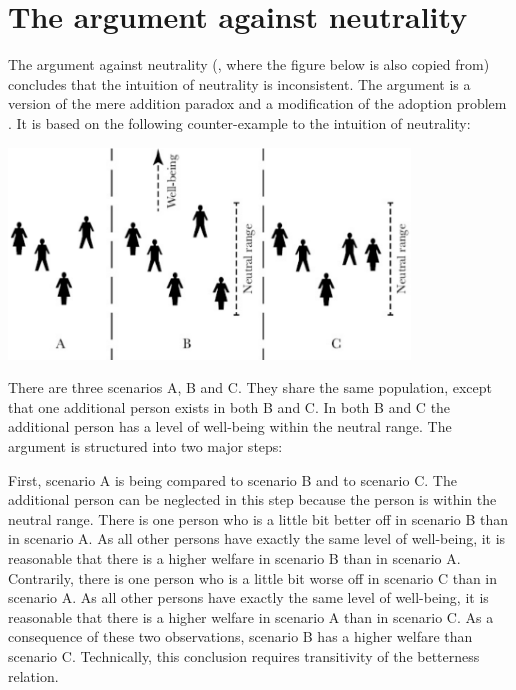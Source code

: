 \section{The argument against neutrality}

The argument against neutrality (, where the figure below is also copied from) concludes that the intuition of neutrality is inconsistent. The argument is a version of the mere addition paradox \cite[p.~148]{broome_2004} and a modification of the adoption problem \cite[p.~161]{broome_2004}. It is based on the following counter-example to the intuition of neutrality:  

\begin{center}
  \includegraphics[width=0.8\textwidth]{3-fig-1}
\end{center}

There are three scenarios A, B and C. They share the same population, except that one additional person exists in both B and C. In both B and C the additional person has a level of well-being within the neutral range. The argument is structured into two major steps:  

First, scenario A is being compared to scenario B and to scenario C. The additional person can be neglected in this step because the person is within the neutral range. There is one person who is a little bit better off in scenario B than in scenario A. As all other persons have exactly the same level of well-being, it is reasonable that there is a higher welfare in scenario B than in scenario A. Contrarily, there is one person who is a little bit worse off in scenario C than in scenario A. As all other persons have exactly the same level of well-being, it is reasonable that there is a higher welfare in scenario A than in scenario C. As a consequence of these two observations, scenario B has a higher welfare than scenario C. Technically, this conclusion requires transitivity of the betterness relation.  

